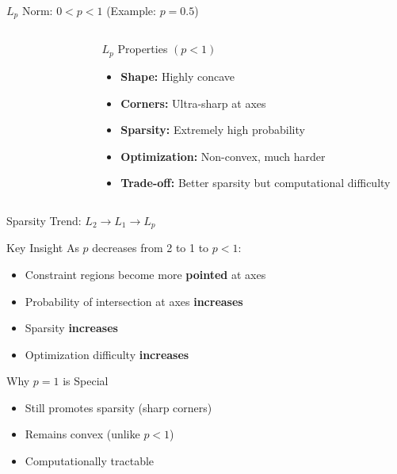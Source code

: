 \documentclass{beamer}
\begin{document}
\begin{frame}{$L_p$ Norm: $0 < p < 1$ (Example: $p=0.5$)}
\begin{columns}
\begin{column}{0.6\textwidth}
\begin{figure}
\end{figure}
\end{column}
\begin{column}{0.4\textwidth}
\begin{keypointsbox}{$L_p$ Properties $(p<1)$}
\begin{itemize}
\item \textbf{Shape:} Highly concave
\item \textbf{Corners:} Ultra-sharp at axes
\item \textbf{Sparsity:} Extremely high probability
\item \textbf{Optimization:} Non-convex, much harder
\item \textbf{Trade-off:} Better sparsity but computational difficulty
\end{itemize}
\end{keypointsbox}
\end{column}
\end{columns}
\end{frame}

\begin{frame}{Sparsity Trend: $L_2 \to L_1 \to L_p$}
\begin{theorembox}{Key Insight}
As $p$ decreases from 2 to 1 to $p < 1$:
\begin{itemize}
\item Constraint regions become more \textbf{pointed} at axes
\item Probability of intersection at axes \textbf{increases}
\item Sparsity \textbf{increases}
\item Optimization difficulty \textbf{increases}
\end{itemize}
\end{theorembox}
\pause

\begin{alertbox}{Why $p = 1$ is Special}
\begin{itemize}
\item Still promotes sparsity (sharp corners)
\item Remains convex (unlike $p < 1$)
\item Computationally tractable
\end{itemize}
\end{alertbox}
\end{frame}
\end{document}
